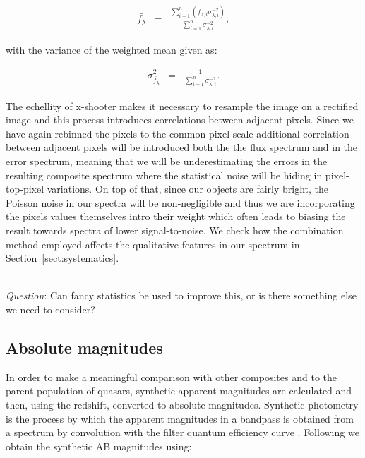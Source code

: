 \documentclass{aa}    %
\newcommand{\eqlabel}[1]{\label{eq:#1}}
\newcommand{\sectionname}{Section}
\newcommand{\Sect}[1]{\sectionname~\ref{sect:#1}}
\newcommand{\sect}[1]{\Sect{#1}}
\newcommand{\sectlabel}[1]{\label{sect:#1}}
\newcommand{\todo}[3]{{\color{#2}\emph{#1}: #3}}
\newcommand{\qtodo}[1]{\todo{\\ Question}{red}{#1}}
\begin{document}
\begin{eqnarray} \eqlabel{wmean}
\bar{f_{\lambda}} &=& \frac{ \sum_{i=1}^n \left( f_{\lambda, i} \sigma_{\lambda, i}^{-2} \right)}{\sum_{i=1}^n \sigma_{\lambda, i}^{-2}},
\end{eqnarray}

with the variance of the weighted mean given as: 
 
\begin{eqnarray} \eqlabel{sigma-wmean}
\sigma_{\bar{f_{\lambda}}}^2 &=& \frac{ 1 }{\sum_{i=1}^n \sigma_{\lambda, i}^{-2}}.
\end{eqnarray}

The echellity of x-shooter makes it necessary to resample the image on a rectified image and this process introduces correlations between adjacent pixels. Since we have again rebinned the pixels to the common pixel scale additional correlation between adjacent pixels will be introduced both the the flux spectrum and in the error spectrum, meaning that we will be underestimating the errors in the resulting composite spectrum where the statistical noise will be hiding in pixel-top-pixel variations. On top of that, since our objects are fairly bright, the Poisson noise in our spectra will be non-negligible and thus we are incorporating the pixels values themselves intro their weight which often leads to biasing the result towards spectra of lower signal-to-noise. We check how the combination method employed affects the qualitative features in our spectrum in \sect{systematics}.

\qtodo{Can fancy statistics be used to improve this, or is there something else we need to consider?}




\subsection{Absolute magnitudes} \sectlabel{absmag}

In order to make a meaningful comparison with other composites and to the parent population of quasars, synthetic apparent magnitudes are calculated and then, using the redshift, converted to absolute magnitudes. Synthetic photometry is the process by which the apparent magnitudes in a bandpass is obtained from a spectrum by convolution with the filter quantum efficiency curve \cite{Bessell2005}. Following \citep{Bessell2012, Casagrande2014} we obtain the synthetic AB magnitudes using:
\end{document}
